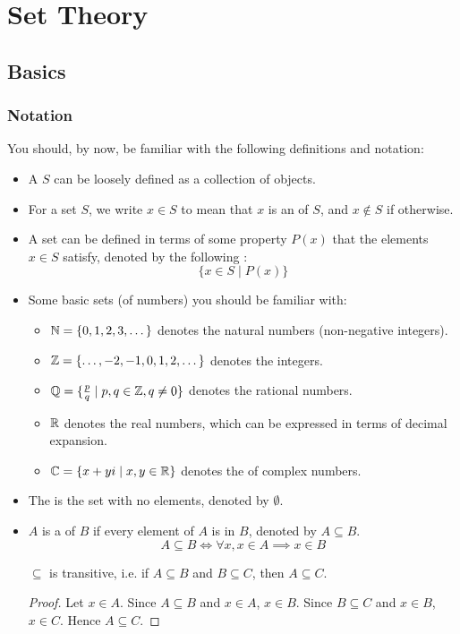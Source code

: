 \chapter{Set Theory}
\section{Basics}
\subsection{Notation}
You should, by now, be familiar with the following definitions and notation:
\begin{itemize}
\item A  $S$ can be loosely defined as a collection of objects.

\item For a set $S$, we write $x \in S$ to mean that $x$ is an  of $S$, and $x \notin S$ if otherwise.

\item A set can be defined in terms of some property $P(x)$ that the elements $x \in S$ satisfy, denoted by the following :
\[ \{x \in S \mid P(x)\} \]

\item Some basic sets (of numbers) you should be familiar with:
\begin{itemize}
\item $\mathbb N=\{0,1,2,3,\dots\}$ denotes the natural numbers (non-negative integers).
\item $\mathbb Z=\{\dots,-2,-1,0,1,2,\dots\}$ denotes the integers.
\item $\mathbb Q=\{\frac{p}{q} \mid p,q\in\mathbb Z, q\neq0\}$ denotes the rational numbers.
\item $\mathbb R$ denotes the real numbers, which can be expressed in terms of decimal expansion.
\item $\mathbb C=\{x+yi \mid x,y\in\mathbb R\}$ denotes the of complex numbers.
\end{itemize}

\item The  is the set with no elements, denoted by $\emptyset$.

\item $A$ is a  of $B$ if every element of $A$ is in $B$, denoted by $A \subseteq B$.
\[ A \subseteq B \iff \forall x, x\in A \implies x\in B \]

$\subseteq$ is transitive, i.e. if $A \subseteq B$ and $B \subseteq C$, then $A \subseteq C$.
\begin{proof}
Let $x\in A$. 
Since $A \subseteq B$ and $x\in A$, $x\in B$. 
Since $B \subseteq C$ and $x\in B$, $x\in C$. 
Hence $A \subseteq C$.
\end{proof}


\end{itemize}
